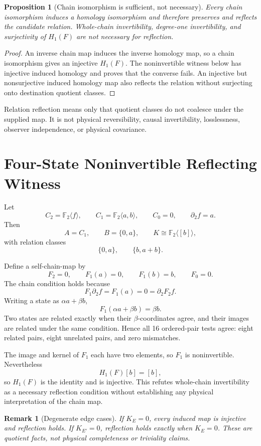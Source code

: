 \documentclass[11pt]{article}
\newtheorem{proposition}{Proposition}
\newtheorem{remark}{Remark}
\newcommand{\Ftwo}{\mathbb F_2}
\begin{document}
\begin{proposition}[Chain isomorphism is sufficient, not necessary]
Every chain isomorphism induces a homology isomorphism and therefore preserves
and reflects the candidate relation. Whole-chain invertibility, degree-one
invertibility, and surjectivity of \(H_1(F)\) are not necessary for
reflection.
\end{proposition}

\begin{proof}
An inverse chain map induces the inverse homology map, so a chain isomorphism
gives an injective \(H_1(F)\). The noninvertible witness below has injective
induced homology and proves that the converse fails. An injective but
nonsurjective induced homology map also reflects the relation without
surjecting onto destination quotient classes.
\end{proof}

Relation reflection means only that quotient classes do not coalesce under
the supplied map. It is not physical reversibility, causal invertibility,
losslessness, observer independence, or physical covariance.

\section{Four-State Noninvertible Reflecting Witness}

Let
\[
C_2=\Ftwo\langle f\rangle,\qquad
C_1=\Ftwo\langle a,b\rangle,\qquad C_0=0,
\qquad \partial_2f=a.
\]
Then
\[
A=C_1,\qquad B=\{0,a\},\qquad K\cong\Ftwo\langle[b]\rangle,
\]
with relation classes
\[
\{0,a\},\qquad \{b,a+b\}.
\]

Define a self-chain-map by
\[
F_2=0,\qquad F_1(a)=0,\qquad F_1(b)=b,\qquad F_0=0.
\]
The chain condition holds because
\[
F_1\partial_2f=F_1(a)=0=\partial_2F_2f.
\]
Writing a state as \(\alpha a+\beta b\),
\[
F_1(\alpha a+\beta b)=\beta b.
\]
Two states are related exactly when their \(\beta\)-coordinates agree, and
their images are related under the same condition. Hence all 16 ordered-pair
tests agree: eight related pairs, eight unrelated pairs, and zero mismatches.

The image and kernel of \(F_1\) each have two elements, so \(F_1\) is
noninvertible. Nevertheless
\[
H_1(F)[b]=[b],
\]
so \(H_1(F)\) is the identity and is injective. This refutes whole-chain
invertibility as a necessary reflection condition without establishing any
physical interpretation of the chain map.

\begin{remark}[Degenerate edge cases]
If \(K_E=0\), every induced map is injective and reflection holds. If
\(K_{E'}=0\), reflection holds exactly when \(K_E=0\). These are quotient
facts, not physical completeness or triviality claims.
\end{remark}
\end{document}
